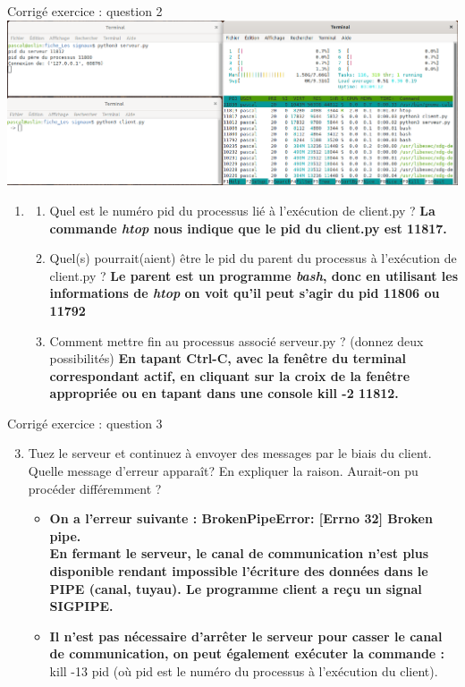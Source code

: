 \documentclass[9pt]{beamer}
\begin{document}
\begin{frame}{Corrigé exercice : question 2}
    \includegraphics[width=1\linewidth]{bash_3x}
\begin{enumerate}
    \item[]
    \setcounter{enumi}{2}
   \begin{enumerate}[<+->]
  \item  Quel est le numéro pid du processus lié à  l'exécution de client.py ?
    \textbf{La commande \textit{ htop}  nous indique que le pid du client.py est 11817.}
    \item Quel(s) pourrait(aient) être le pid du parent du processus à  l'exécution de client.py ?\pause
    \textbf{Le parent est un programme \textit{bash}, donc en utilisant les informations de  \textit{htop} on voit qu'il peut s'agir du pid 11806 ou 11792}
    \item Comment mettre fin au  processus associé serveur.py ? (donnez deux possibilités)\pause
\textbf{En tapant Ctrl-C, avec  la fenêtre du terminal correspondant actif, en cliquant sur la croix de la fenêtre appropriée ou en tapant dans une console kill -2 11812.}
\end{enumerate}
\end{enumerate}
\end{frame}
\begin{frame}{Corrigé exercice : question 3 }
\begin{enumerate}
    \setcounter{enumi}{2}
  \item Tuez le serveur et continuez à envoyer des messages par le biais du client. Quelle message d'erreur apparaît? En expliquer la raison.
 Aurait-on pu procéder différemment ?\pause
   \begin{itemize}[<+->]
     \item  \textbf{On a l'erreur suivante : BrokenPipeError: [Errno 32] Broken pipe.\\ En fermant le serveur, le canal de communication n'est plus disponible rendant impossible l'écriture des données dans le PIPE (canal, tuyau). Le programme client a reçu un signal SIGPIPE.}
     \item  \textbf{Il n'est pas nécessaire d'arrêter le serveur pour casser le canal de communication, on peut également exécuter la commande : } 
     kill -13 pid  (où pid est le numéro du processus à l'exécution du client).
 \end{itemize}

\end{enumerate}
\end{frame}
\end{document}
